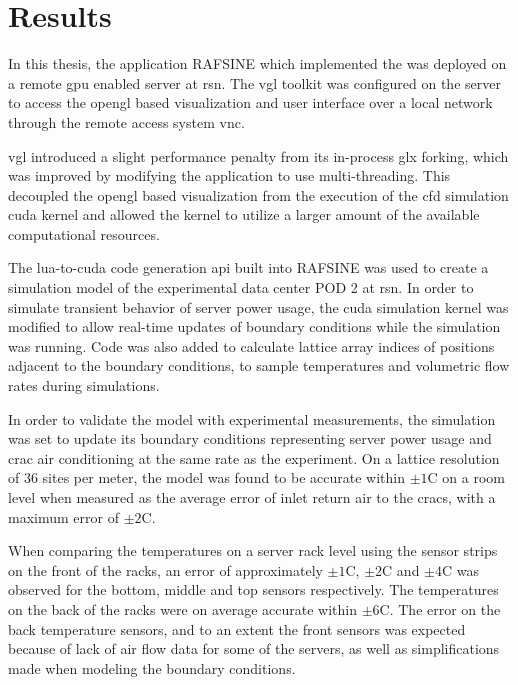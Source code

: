 \section{Results}\label{sec:results}
In this thesis, the  application RAFSINE which implemented the  was deployed on a remote \gls{gpu} enabled server at \gls{rsn}. The \gls{vgl} toolkit was configured on the server to access the \gls{opengl} based visualization and user interface over a local network through the remote access system \gls{vnc}. 

\gls{vgl} introduced a slight performance penalty from its in-process \gls{glx} forking, which was improved by modifying the application to use multi-threading. This decoupled the \gls{opengl} based visualization from the execution of the \gls{cfd} simulation \gls{cuda} kernel and allowed the kernel to utilize a larger amount of the available computational resources.

The \gls{lua}-to-\gls{cuda} code generation \gls{api} built into RAFSINE was used to create a simulation model of the experimental data center POD 2 at \gls{rsn}. In order to simulate transient behavior of server power usage, the \gls{cuda} simulation kernel was modified to allow real-time updates of boundary conditions while the simulation was running. Code was also added to calculate lattice array indices of positions adjacent to the boundary conditions, to sample temperatures and volumetric flow rates during simulations.

In order to validate the model with experimental measurements, the simulation was set to update its boundary conditions representing server power usage and \gls{crac} air conditioning at the same rate as the experiment. On a lattice resolution of 36 sites per meter, the model was found to be accurate within $\pm 1$\degree C on a room level when measured as the average error of inlet return air to the \gls{crac}s, with a maximum error of $\pm 2$\degree C.

When comparing the temperatures on a server rack level using the sensor strips on the front of the racks, an error of approximately $\pm 1$\degree C, $\pm 2$\degree C and $\pm 4$\degree C was observed for the bottom, middle and top sensors respectively. The temperatures on the back of the racks were on average accurate within $\pm 6$\degree C. The error on the back temperature sensors, and to an extent the front sensors was expected because of lack of air flow data for some of the servers, as well as simplifications made when modeling the boundary conditions.

